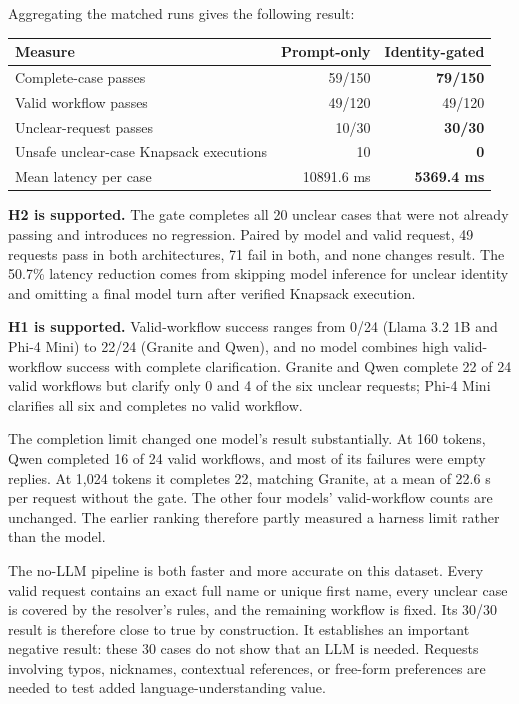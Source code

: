\documentclass[
  10pt,
  letterpaper,
]{article}
\begin{document}
Aggregating the matched runs gives the following result:

\begin{longtable}[]{@{}lrr@{}}
\toprule\noalign{}
Measure & Prompt-only & Identity-gated \\
\midrule\noalign{}
\endhead
\bottomrule\noalign{}
\endlastfoot
Complete-case passes & 59/150 & \textbf{79/150} \\
Valid workflow passes & 49/120 & 49/120 \\
Unclear-request passes & 10/30 & \textbf{30/30} \\
Unsafe unclear-case Knapsack executions & 10 & \textbf{0} \\
Mean latency per case & 10891.6 ms & \textbf{5369.4 ms} \\
\end{longtable}

\textbf{H2 is supported.} The gate completes all 20 unclear cases that
were not already passing and introduces no regression. Paired by model
and valid request, 49 requests pass in both architectures, 71 fail in
both, and none changes result. The 50.7\% latency reduction comes from
skipping model inference for unclear identity and omitting a final model
turn after verified Knapsack execution.

\textbf{H1 is supported.} Valid-workflow success ranges from 0/24 (Llama
3.2 1B and Phi-4 Mini) to 22/24 (Granite and Qwen), and no model
combines high valid-workflow success with complete clarification.
Granite and Qwen complete 22 of 24 valid workflows but clarify only 0
and 4 of the six unclear requests; Phi-4 Mini clarifies all six and
completes no valid workflow.

The completion limit changed one model's result substantially. At 160
tokens, Qwen completed 16 of 24 valid workflows, and most of its
failures were empty replies. At 1,024 tokens it completes 22, matching
Granite, at a mean of 22.6 s per request without the gate. The other
four models' valid-workflow counts are unchanged. The earlier ranking
therefore partly measured a harness limit rather than the model.

The no-LLM pipeline is both faster and more accurate on this dataset.
Every valid request contains an exact full name or unique first name,
every unclear case is covered by the resolver's rules, and the remaining
workflow is fixed. Its 30/30 result is therefore close to true by
construction. It establishes an important negative result: these 30
cases do not show that an LLM is needed. Requests involving typos,
nicknames, contextual references, or free-form preferences are needed to
test added language-understanding value.
\end{document}
